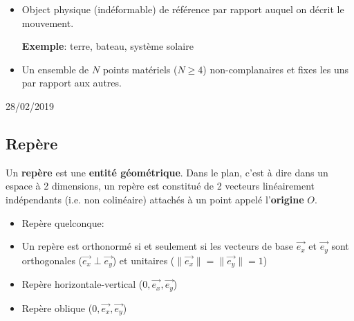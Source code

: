 \documentclass[
    11pt,
    a4paper,
    oneside,
    headinlcude, footinclude,
    twoside,
]{report}
\newcommand{\markDate}[1]{\begin{flushright}#1\end{flushright}}
\renewcommand{\vec}[1]{\overrightarrow{#1}}
\begin{document}
\begin{itemize}
\item Object physique (indéformable) de référence par rapport auquel on
décrit le mouvement.

\textbf{Exemple}: terre, bateau, système solaire
\item Un ensemble de $N$ points matériels ($N \geq 4$) non-complanaires et fixes
les uns par rapport aux autres.
\end{itemize}


\markDate{28/02/2019}

\subsection{Repère}
\label{sub:repere}

Un \textbf{repère} est une \textbf{entité géométrique}. Dans le plan, c'est à
dire dans un espace à 2 dimensions, un repère est constitué de 2 vecteurs
linéairement indépendants (i.e. non colinéaire) attachés à un point appelé
l'\textbf{origine} $O$.

\begin{itemize}
\item Repère quelconque:

\begin{center}
\end{center}

\item Un repère est orthonormé si et seulement si les vecteurs de base
$\vec{e_{x}}$ et $\vec{e_{y}}$ sont orthogonales ($\vec{e_{x}} \perp
\vec{e_{y}}$) et unitaires ($\| \vec{e_{x}} \| = \| \vec{e_{y}} \| = 1$)

\pagebreak

\item Repère horizontale-vertical ($0, \vec{e_{x}}, \vec{e_{y}}$)
\begin{center}
\end{center}

\item  Repère oblique ($0, \vec{e_{x}}, \vec{e_{y}}$)
\begin{center}
\end{center}
\end{itemize}
\end{document}
